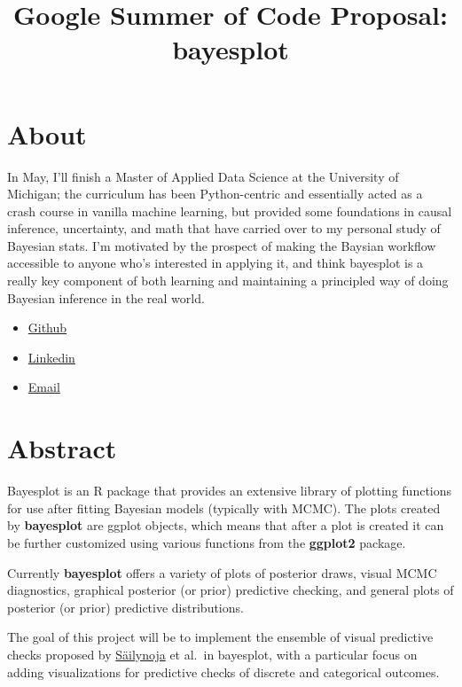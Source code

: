 \documentclass[
  letterpaper,
  DIV=11,
  numbers=noendperiod]{scrartcl}
\title{Google Summer of Code Proposal: bayesplot}
\author{}
\date{}
\begin{document}
\maketitle

\section{About}\label{about}

In May, I'll finish a Master of Applied Data Science at the University
of Michigan; the curriculum has been Python-centric and essentially
acted as a crash course in vanilla machine learning, but provided some
foundations in causal inference, uncertainty, and math that have carried
over to my personal study of Bayesian stats. I'm motivated by the
prospect of making the Baysian workflow accessible to anyone who's
interested in applying it, and think bayesplot is a really key component
of both learning and maintaining a principled way of doing Bayesian
inference in the real world.

\begin{itemize}
\item
  \href{https://github.com/MichaelPaulLight}{Github}
\item
  \href{https://www.linkedin.com/in/michael-paul-light/}{Linkedin}
\item
  \href{michaelpaullight@gmail.com}{Email}
\end{itemize}

\section{Abstract}\label{abstract}

Bayesplot is an R package that provides an extensive library of plotting
functions for use after fitting Bayesian models (typically with MCMC).
The plots created by \textbf{bayesplot} are ggplot objects, which means
that after a plot is created it can be further customized using various
functions from the \textbf{ggplot2} package.

Currently \textbf{bayesplot} offers a variety of plots of posterior
draws, visual MCMC diagnostics, graphical posterior (or prior)
predictive checking, and general plots of posterior (or prior)
predictive distributions.

The goal of this project will be to implement the ensemble of visual
predictive checks proposed by
\href{https://teemusailynoja.github.io/visual-predictive-checks/}{Säilynoja}
et al.~in bayesplot, with a particular focus on adding visualizations
for predictive checks of discrete and categorical outcomes.
\end{document}
